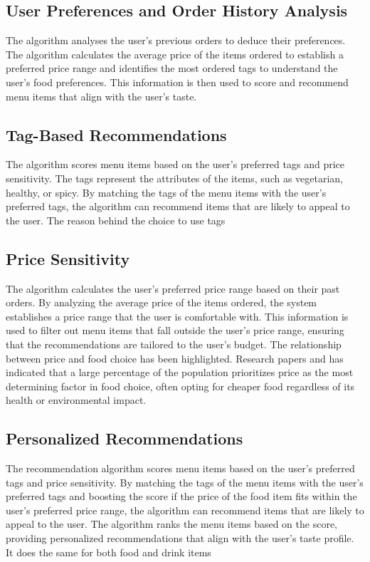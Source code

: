 \subsection{User Preferences and Order History Analysis}
The algorithm analyses the user's previous orders to deduce their preferences. The algorithm calculates the average price of the items ordered to establish a preferred price range and identifies the most ordered tags to understand the user's food preferences. This information is then used to score and recommend menu items that align with the user's taste.

\subsection{Tag-Based Recommendations}
The algorithm scores menu items based on the user's preferred tags and price sensitivity. The tags represent the attributes of the items, such as vegetarian, healthy, or spicy. By matching the tags of the menu items with the user's preferred tags, the algorithm can recommend items that are likely to appeal to the user. The reason behind the choice to use tags 

\subsection{Price Sensitivity}
The algorithm calculates the user's preferred price range based on their past orders. By analyzing the average price of the items ordered, the system establishes a price range that the user is comfortable with. This information is used to filter out menu items that fall outside the user's price range, ensuring that the recommendations are tailored to the user's budget. The relationship between price and food choice has been highlighted. Research papers \cite{34} and \cite{35} has indicated that a large percentage of the population prioritizes price as the most determining factor in food choice, often opting for cheaper food regardless of its health or environmental impact.

\subsection{Personalized Recommendations}
The recommendation algorithm scores menu items based on the user's preferred tags and price sensitivity. By matching the tags of the menu items with the user's preferred tags and boosting the score if the price of the food item fits within the user's preferred price range, the algorithm can recommend items that are likely to appeal to the user. The algorithm ranks the menu items based on the score, providing personalized recommendations that align with the user's taste profile. It does the same for both food and drink items

